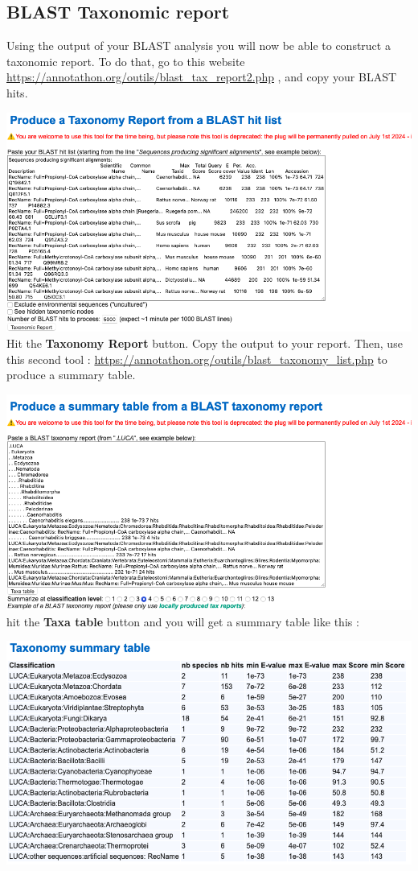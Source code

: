 \documentclass[
]{book}
\begin{document}
\hypertarget{blast-taxonomic-report}{%
\subsection{BLAST Taxonomic report}\label{blast-taxonomic-report}}

Using the output of your BLAST analysis you will now be able to construct a taxonomic report. To do that, go to this website \url{https://annotathon.org/outils/blast_tax_report2.php} , and copy your BLAST hits.

\includegraphics{figures/Annotathon/Annot_Taxonomy_from_BLAST.png}
Hit the \textbf{Taxonomy Report} button. Copy the output to your report. Then, use this second tool : \url{https://annotathon.org/outils/blast_taxonomy_list.php} to produce a summary table.

\includegraphics{figures/Annotathon/Annot_taxonomy_summary_tool.png}
hit the \textbf{Taxa table} button and you will get a summary table like this :

\includegraphics{figures/Annotathon/Annot_taxonomy_summary.png}
\end{document}
